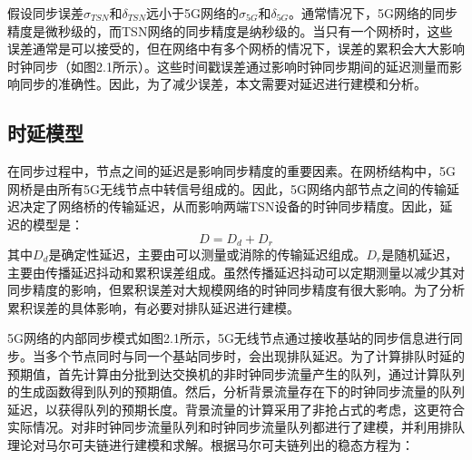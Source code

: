 \documentclass[UTF8,a4paper,12pt]{ctexart}
\numberwithin{equation}{section}
\begin{document}
	假设同步误差$\sigma_{TSN}$和$\delta_{TSN}$远小于5G网络的$\sigma_{5G}$和$\delta_{5G}$。通常情况下，5G网络的同步精度是微秒级的，而TSN网络的同步精度是纳秒级的。当只有一个网桥时，这些误差通常是可以接受的，但在网络中有多个网桥的情况下，误差的累积会大大影响时钟同步（如图2.1所示）。这些时间戳误差通过影响时钟同步期间的延迟测量而影响同步的准确性。因此，为了减少误差，本文需要对延迟进行建模和分析。
	\subsection{时延模型}
	在同步过程中，节点之间的延迟是影响同步精度的重要因素。在网桥结构中，5G网桥是由所有5G无线节点中转信号组成的。因此，5G网络内部节点之间的传输延迟决定了网络桥的传输延迟，从而影响两端TSN设备的时钟同步精度。因此，延迟的模型是：
	\begin{equation}
		D=D_d+D_r
	\end{equation}
	其中$D_d$是确定性延迟，主要由可以测量或消除的传输延迟组成。$D_r$是随机延迟，主要由传播延迟抖动和累积误差组成。虽然传播延迟抖动可以定期测量以减少其对同步精度的影响，但累积误差对大规模网络的时钟同步精度有很大影响。为了分析累积误差的具体影响，有必要对排队延迟进行建模。
	\begin{figure}[htb] 
	\end{figure}
	5G网络的内部同步模式如图2.1所示，5G无线节点通过接收基站的同步信息进行同步。当多个节点同时与同一个基站同步时，会出现排队延迟。为了计算排队时延的预期值，首先计算由分批到达交换机的非时钟同步流量产生的队列，通过计算队列的生成函数得到队列的预期值。然后，分析背景流量存在下的时钟同步流量的队列延迟，以获得队列的预期长度。背景流量的计算采用了非抢占式的考虑，这更符合实际情况。对非时钟同步流量队列和时钟同步流量队列都进行了建模，并利用排队理论对马尔可夫链进行建模和求解。根据马尔可夫链列出的稳态方程为：
	
\end{document}
